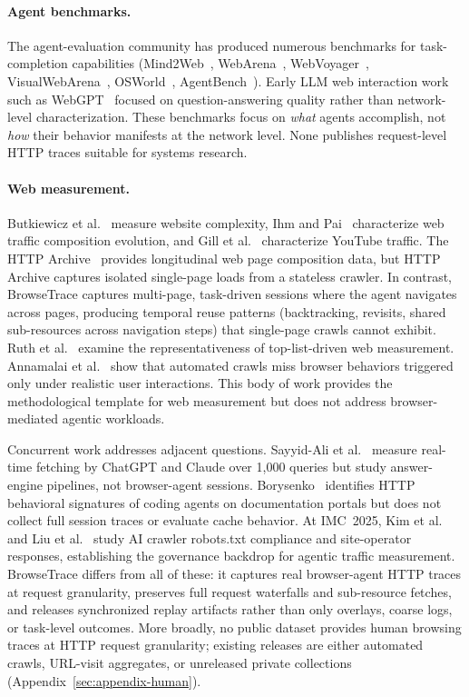 \documentclass[10pt,sigconf,letterpaper,anonymous,nonacm]{acmart}
\newcommand{\sysname}{Browse\-Trace\xspace}
\begin{document}
\paragraph{Agent benchmarks.}
The agent-evaluation community has produced numerous benchmarks for
task-completion capabilities (Mind2Web~\cite{mind2web},
WebArena~\cite{webarena}, WebVoyager~\cite{webvoyager},
VisualWebArena~\cite{visualwebarena}, OSWorld~\cite{osworld},
AgentBench~\cite{agentbench}).  Early LLM web interaction work such as WebGPT~\cite{nakano2021webgpt} focused on question-answering quality rather than network-level characterization.
These benchmarks focus on \emph{what} agents
accomplish, not \emph{how} their behavior manifests at the network
level.  None publishes request-level HTTP traces suitable for systems
research.

\paragraph{Web measurement.}
Butkiewicz et al.~\cite{butkiewicz2011} measure website complexity,
Ihm and Pai~\cite{ihm2011} characterize web traffic composition
evolution, and Gill et al.~\cite{gill2007} characterize YouTube
traffic.  The HTTP Archive~\cite{httparchive} provides longitudinal
web page composition data, but HTTP Archive captures
isolated single-page loads from a stateless crawler.  In contrast,
\sysname captures multi-page, task-driven sessions where the agent
navigates across pages, producing temporal reuse patterns
(backtracking, revisits, shared sub-resources across navigation steps)
that single-page crawls cannot exhibit.  Ruth et al.~\cite{ruth2022toppling} examine the representativeness
of top-list-driven web measurement.  Annamalai et al.~\cite{annamalai2025beyondcrawl} show that automated crawls miss browser behaviors triggered only under realistic user interactions.
This body of work provides the methodological template for web
measurement but does not address browser-mediated agentic workloads.

Concurrent work addresses adjacent questions. Sayyid-Ali et al.~\cite{sayyidali2026sustainable} measure real-time fetching by ChatGPT and Claude over 1{,}000 queries but study answer-engine pipelines, not browser-agent sessions. Borysenko~\cite{borysenko2026devexp} identifies HTTP behavioral signatures of coding agents on documentation portals but does not collect full session traces or evaluate cache behavior. At IMC~2025, Kim et al.~\cite{kim2025robots} and Liu et al.~\cite{liu2025somesite} study AI crawler robots.txt compliance and site-operator responses, establishing the governance backdrop for agentic traffic measurement. \sysname differs from all of these: it captures real browser-agent HTTP traces at request granularity, preserves full request waterfalls and sub-resource fetches, and releases synchronized replay artifacts rather than only overlays, coarse logs, or task-level outcomes. More broadly, no public dataset provides human browsing traces at HTTP request granularity; existing releases are either automated crawls, URL-visit aggregates, or unreleased private collections (Appendix~\ref{sec:appendix-human}).
\end{document}

